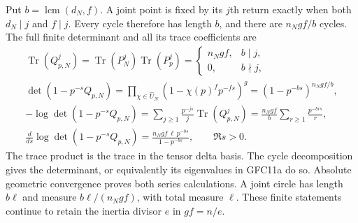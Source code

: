 Put $b=\operatorname{lcm}(d_N,f)$. A joint point is fixed by its
$j$th return exactly when both $d_N\mid j$ and $f\mid j$.
Every cycle therefore has length $b$, and there are $n_Ngf/b$
cycles. The full finite determinant and all its trace coefficients are
\begin{equation}\tag{GFC11b}
 \begin{gathered}
 \operatorname{Tr}(Q_{p,N}^j)
  =\operatorname{Tr}(P_N^j)\operatorname{Tr}(P_p^j)
  =\begin{cases}n_Ngf,&b\mid j,\\0,&b\nmid j,\end{cases}\\
 \det(1-p^{-s}Q_{p,N})
   =\prod_{\chi\in\widehat U_N}(1-\chi(p)^f p^{-fs})^g
   =(1-p^{-bs})^{n_Ngf/b},\\
 -\log\det(1-p^{-s}Q_{p,N})
   =\sum_{j\ge1}\frac{p^{-js}}j\operatorname{Tr}(Q_{p,N}^j)
   =\frac{n_Ngf}{b}\sum_{r\ge1}\frac{p^{-brs}}r,\\
 \frac{d}{ds}\log\det(1-p^{-s}Q_{p,N})
   =\frac{n_Ngf\,\ell\,p^{-bs}}{1-p^{-bs}},\qquad \Re s>0.
 \end{gathered}
\end{equation}
The trace product is the trace in the tensor delta basis. The
cycle decomposition gives the determinant, or equivalently its
eigenvalues in GFC11a do so. Absolute geometric convergence
proves both series calculations. A joint circle has length
$b\ell$ and measure $b\ell/(n_Ngf)$, with total measure $\ell$.
These finite statements continue to retain the inertia divisor $e$
in $gf=n/e$.


